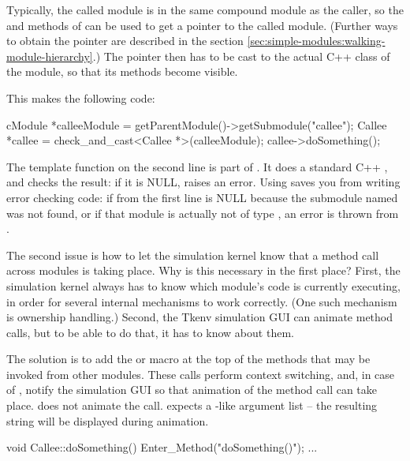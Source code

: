 Typically, the called module is in the same compound module as the caller,
so the  and  methods of
 can be used to get a  pointer to the
called module. (Further ways to obtain the pointer are described
in the section \ref{sec:simple-modules:walking-module-hierarchy}.)
The  pointer then has to be cast to the actual C++ class
of the module, so that its methods become visible.

This makes the following code:

\begin{cpp}
cModule *calleeModule = getParentModule()->getSubmodule("callee");
Callee *callee = check_and_cast<Callee *>(calleeModule);
callee->doSomething();
\end{cpp}

The  template function on the second line
is part of {\opp}. It does a standard C++ ,
and checks the result: if it is NULL,  raises an {\opp} error.
Using  saves you from writing error checking
code: if  from the first line is NULL because
the submodule named  was not found, or if that
module is actually not of type , an error is thrown
from .

The second issue is how to let the simulation kernel know that
a method call across modules is taking place. Why is this necessary
in the first place? First, the simulation kernel always has to know which
module's code is currently executing, in order for several internal
mechanisms to work correctly. (One such mechanism is ownership handling.)
Second, the Tkenv simulation GUI can animate method calls,
but to be able to do that, it has to know about them.

The solution is to add the  or 
macro at the top of the methods that may be invoked from other
modules. These calls perform context switching, and, in case of
, notify the simulation GUI so that animation
of the method call can take place. 
does not animate the call.  expects a
-like argument list -- the resulting string will
be displayed during animation.

\begin{cpp}
void Callee::doSomething()
{
    Enter_Method("doSomething()");
    ...
}
\end{cpp}



